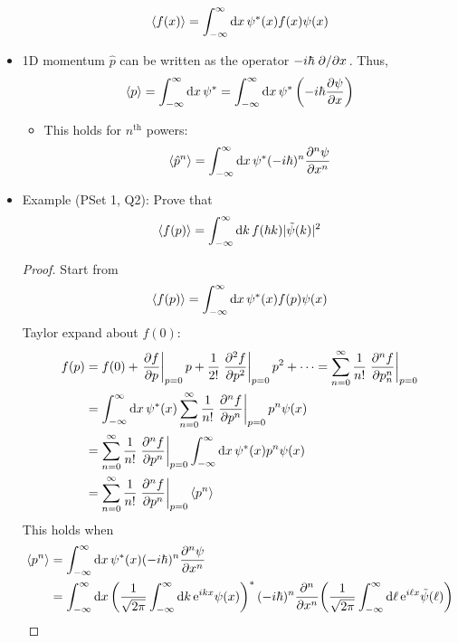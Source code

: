\documentclass[../notes.tex]{subfiles}
\begin{document}
\begin{itemize}
    \begin{equation*}
        \langle{f(x)}\rangle = \int_{-\infty}^\infty\dd{x}\psi^*(x)f(x)\psi(x)
    \end{equation*}
    \item 1D momentum $\hat{p}$ can be written as the operator $-i\hbar\pdv*{x}$. Thus,
    \begin{equation*}
        \langle{p}\rangle = \int_{-\infty}^\infty\dd{x}\psi^*
        = \int_{-\infty}^\infty\dd{x}\psi^*\left( -i\hbar\pdv{\psi}{x} \right)
    \end{equation*}
    \begin{itemize}
        \item This holds for $n^\text{th}$ powers:
        \begin{equation*}
            \langle{\hat{p}^n}\rangle = \int_{-\infty}^\infty\dd{x}\psi^*(-i\hbar)^n\pdv[n]{\psi}{x}
        \end{equation*}
    \end{itemize}
    \item Example (PSet 1, Q2): Prove that
    \begin{equation*}
        \langle{f(p)}\rangle = \int_{-\infty}^\infty\dd{k}f(\hbar k)|\tilde{\psi}(k)|^2
    \end{equation*}
    \begin{proof}
        Start from
        \begin{equation*}
            \langle{f(p)}\rangle = \int_{-\infty}^\infty\dd{x}\psi^*(x)f(p)\psi(x)
        \end{equation*}
        Taylor expand about $f(0)$:
        \begin{align*}
            f(p) &= f(0)+\eval{\pdv{f}{p}}_{p=0}p+\frac{1}{2!}\eval{\pdv[2]{f}{p}}_{p=0}p^2+\cdots
            = \sum_{n=0}^\infty\frac{1}{n!}\eval{\pdv[n]{f}{p_n}}_{p=0}\\
            &= \int_{-\infty}^\infty\dd{x}\psi^*(x)\sum_{n=0}^\infty\frac{1}{n!}\eval{\pdv[n]{f}{p}}_{p=0}p^n\psi(x)\\
            &= \sum_{n=0}^\infty\frac{1}{n!}\eval{\pdv[n]{f}{p}}_{p=0}\int_{-\infty}^\infty\dd{x}\psi^*(x)p^n\psi(x)\\
            &= \sum_{n=0}^\infty\frac{1}{n!}\eval{\pdv[n]{f}{p}}_{p=0}\Exp{p^n}
        \end{align*}
        This holds when
        \begin{align*}
            \Exp{p^n} &= \int_{-\infty}^\infty\dd{x}\psi^*(x)(-i\hbar)^n\pdv[n]{\psi}{x}\\
            &= \int_{-\infty}^\infty\dd{x}\left( \frac{1}{\sqrt{2\pi}}\int_{-\infty}^\infty\dd{k}\e[ikx]\psi(x) \right)^*(-i\hbar)^n\pdv[n]{x}(\frac{1}{\sqrt{2\pi}}\int_{-\infty}^\infty\dd{\ell}\e[i\ell x]\tilde{\psi}(\ell))\\

\end{align*}
\end{proof}
\end{itemize}
\end{document}
